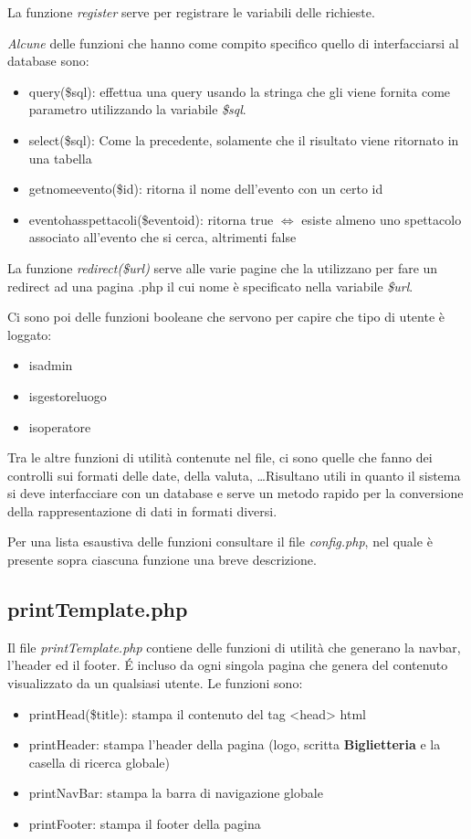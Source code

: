 \documentclass[10pt, a4paper]{article}
\begin{document}
La funzione \textit{register} serve per registrare le variabili delle richieste.

\emph{Alcune} delle funzioni che hanno come compito specifico 
quello di interfacciarsi al database sono:
\begin{itemize}
  \item{query(\$sql): effettua una query usando la stringa che gli viene fornita come
    parametro utilizzando la variabile \textit{\$sql}.}
  \item{select(\$sql): Come la precedente, solamente che il risultato viene ritornato
    in una tabella}
  \item{get\textunderscore nome\textunderscore evento(\$id): ritorna il nome 
    dell'evento con un certo id}
  \item{evento\textunderscore has\textunderscore spettacoli(\$eventoid):
    ritorna true $\iff$ esiste almeno uno spettacolo associato all'evento che si cerca, altrimenti false}
\end{itemize}

La funzione \textit{redirect(\$url)} serve alle varie pagine che la utilizzano per fare
un redirect ad una pagina .php il cui nome è specificato nella variabile \textit{\$url}.

Ci sono poi delle funzioni booleane che servono per capire che tipo di utente è loggato:
\begin{itemize}
  \item{is\textunderscore admin}
  \item{is\textunderscore gestore\textunderscore luogo}
  \item{is\textunderscore operatore}
\end{itemize}

Tra le altre funzioni di utilità contenute nel file, ci sono quelle che fanno dei controlli
sui formati delle date, della valuta, \dots Risultano utili in quanto il sistema si deve interfacciare con un database e serve un metodo rapido per la conversione della rappresentazione di dati in formati diversi.

Per una lista esaustiva delle funzioni consultare il file \emph{config.php}, nel quale è presente sopra ciascuna funzione una breve descrizione. 

\subsection{printTemplate.php}
Il file \textit{printTemplate.php} contiene delle funzioni di utilità che generano
la navbar, l'header ed il footer. É incluso da ogni singola pagina che genera del
contenuto visualizzato da un qualsiasi utente. Le funzioni sono:
\begin{itemize}
  \item{printHead(\$title): stampa il contenuto del tag <head> html}
  \item{printHeader: stampa l'header della pagina (logo, scritta \textbf{Biglietteria} e la casella di ricerca globale)}
  \item{printNavBar: stampa la barra di navigazione globale}
  \item{printFooter: stampa il footer della pagina}
\end{itemize}
\end{document}
